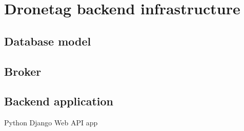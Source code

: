 \chapter{Dronetag backend infrastructure}\label{ch:dronetag-backend-infrastructure}

\section{Database model}\label{sec:database-model}

\section {Broker}\label{sec:broker}

\section{Backend application}\label{sec:backend-application}
Python Django Web API app